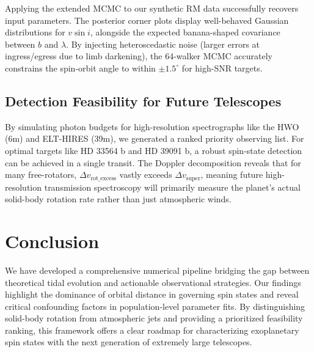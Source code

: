 \documentclass[a4paper,11pt]{article}
\numberwithin{equation}{section}
\begin{document}
Applying the extended MCMC to our synthetic RM data successfully recovers input parameters. The posterior corner plots display well-behaved Gaussian distributions for $v \sin i$, alongside the expected banana-shaped covariance between $b$ and $\lambda$. By injecting heteroscedastic noise (larger errors at ingress/egress due to limb darkening), the 64-walker MCMC accurately constrains the spin-orbit angle to within $\pm 1.5^\circ$ for high-SNR targets.

\subsection{Detection Feasibility for Future Telescopes}



By simulating photon budgets for high-resolution spectrographs like the HWO (6m) and ELT-HIRES (39m), we generated a ranked priority observing list. For optimal targets like HD 33564 b and HD 39091 b, a robust spin-state detection can be achieved in a single transit. The Doppler decomposition reveals that for many free-rotators, $\Delta v_{\text{rot\_excess}}$ vastly exceeds $\Delta v_{\text{super}}$, meaning future high-resolution transmission spectroscopy will primarily measure the planet's actual solid-body rotation rate rather than just atmospheric winds.

\section{Conclusion}

We have developed a comprehensive numerical pipeline bridging the gap between theoretical tidal evolution and actionable observational strategies. Our findings highlight the dominance of orbital distance in governing spin states and reveal critical confounding factors in population-level parameter fits. By distinguishing solid-body rotation from atmospheric jets and providing a prioritized feasibility ranking, this framework offers a clear roadmap for characterizing exoplanetary spin states with the next generation of extremely large telescopes.
\end{document}
